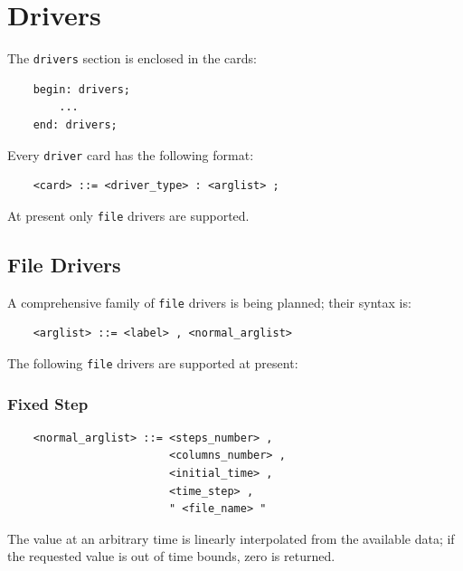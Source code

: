 \documentclass[10pt,dvips]{report}
\begin{document}
\chapter{Drivers}\label{sec:DRIVERS}
The {\tt drivers} section is enclosed in the cards:
\begin{verbatim}
    begin: drivers;
        ...
    end: drivers;
\end{verbatim}
Every {\tt driver} card has the following format:
\begin{verbatim}
    <card> ::= <driver_type> : <arglist> ;
\end{verbatim}
At present only {\tt file} drivers are supported.

\section{File Drivers}
A comprehensive family of {\tt file} drivers is being planned;
their syntax is:
\begin{verbatim}
    <arglist> ::= <label> , <normal_arglist>
\end{verbatim}
The following {\tt file} drivers are supported at present:


\subsection{Fixed Step}
\begin{verbatim}
    <normal_arglist> ::= <steps_number> ,
                         <columns_number> ,
                         <initial_time> ,
                         <time_step> ,
                         " <file_name> "
\end{verbatim}
The value at an arbitrary time is linearly interpolated from the available
data; if the requested value is out of time bounds, zero is returned.
\end{document}
